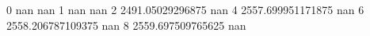 0 nan nan
1 nan nan
2 2491.05029296875 nan
4 2557.699951171875 nan
6 2558.206787109375 nan
8 2559.697509765625 nan
